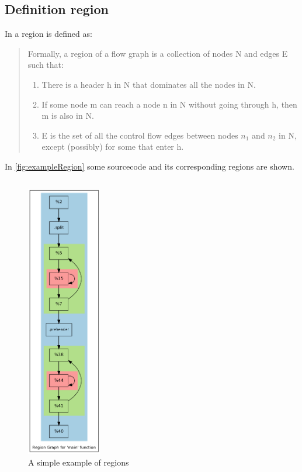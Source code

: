 \subsection{Definition region}\label{subsec:definitionRegion}
In \cite[chapter 9.7.1, p.~672]{Drachenbuch} a region is defined as:

\begin{quote}
    Formally, a region of a flow graph is a collection of nodes N and edges E such that:
    \begin{enumerate}
        \item There is a header h in N that dominates all the nodes in N.
        \item If some node m can reach a node n in N without going through h, then m is also in N.
        \item E is the set of all the control flow edges between nodes \(n_1\) and \(n_2\) in N, except (possibly) for some that enter h.
    \end{enumerate}
\end{quote}
In \autoref{fig:exampleRegion} some sourcecode and its corresponding regions are shown.
\begin{figure}[!ht]
    \caption{A simple example of regions}
    \label{fig:exampleRegion}
    \begin{minipage}{.7\textwidth}
        \inputminted{c++}{cpp/matmul.cpp}
    \end{minipage}
    \begin{minipage}{.2\textwidth}
        \includegraphics[height=12cm]{gfx/matmulRegions.png}
    \end{minipage}
\end{figure}\\

